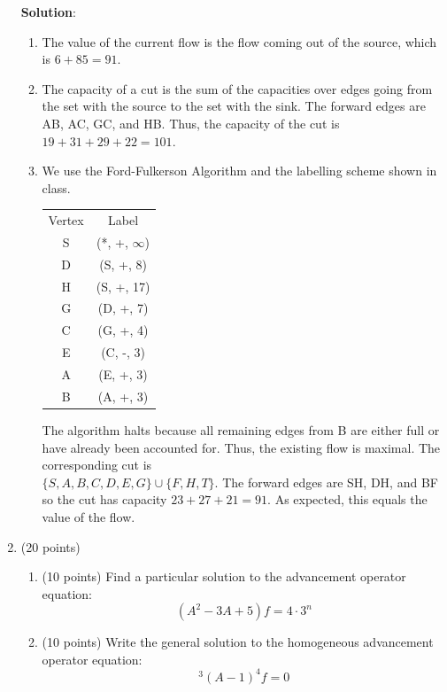 \documentclass[12pt]{article}
\newenvironment{solution}{
\begin{mdframed}
  { {\bfseries Solution}: }}{
\end{mdframed}}
\begin{document}
\begin{enumerate}
    \begin{solution}
      \begin{enumerate}[label=({\alph*})]
        \item The value of the current flow is the flow coming out of the source, which is \(6 + 85 = 91\).
        \item The capacity of a cut is the sum of the capacities over edges going from the set with the source to the set with the sink. The forward edges are AB, AC, GC, and HB. Thus, the capacity of the cut is \(19 + 31 + 29 + 22 = 101\).
        \item We use the Ford-Fulkerson Algorithm and the labelling scheme shown in class.

        \centering
        \begin{tabular}{c c}
          Vertex & Label \\
          S & (*, +, \(\infty\)) \\
          D & (S, +, 8) \\
          H & (S, +, 17) \\
          G & (D, +, 7) \\
          C & (G, +, 4) \\
          E & (C, -, 3) \\
          A & (E, +, 3) \\
          B & (A, +, 3)
        \end{tabular}

        The algorithm halts because all remaining edges from B are either full or have already been accounted for. Thus, the existing flow is maximal. The corresponding cut is \\
        \(\{S, A, B, C, D, E, G\} \cup \{F, H, T\}\). The forward edges are SH, DH, and BF so the cut has capacity \(23 + 27 + 21 = 91\). As expected, this equals the value of the flow.
      \end{enumerate}
    \end{solution}

    \pagebreak

    \item (20 points)
    \begin{enumerate}[label=({\alph*})]
      \item (10 points) Find a particular solution to the advancement operator equation:
      \begin{equation*}
        (A^{2} - 3A + 5) f = 4 \cdot 3^{n}
      \end{equation*}
      \item (10 points) Write the general solution to the homogeneous advancement operator equation:
      \begin{equation}
        [A - (7 - 2i)]^{3} (A - 1)^{4} f = 0
      \end{equation}
    \end{enumerate}


\end{enumerate}
\end{document}
